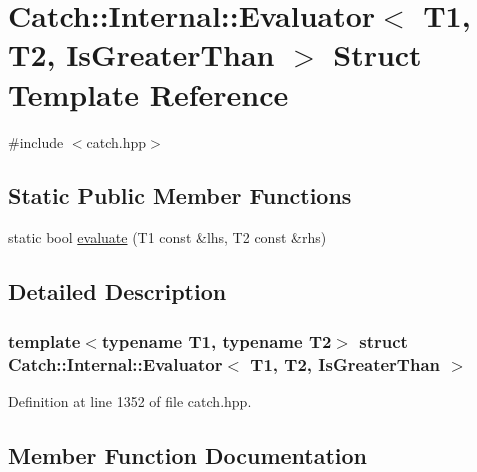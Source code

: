 \hypertarget{struct_catch_1_1_internal_1_1_evaluator_3_01_t1_00_01_t2_00_01_is_greater_than_01_4}{}\section{Catch\+:\+:Internal\+:\+:Evaluator$<$ T1, T2, Is\+Greater\+Than $>$ Struct Template Reference}
\label{struct_catch_1_1_internal_1_1_evaluator_3_01_t1_00_01_t2_00_01_is_greater_than_01_4}


{\ttfamily \#include $<$catch.\+hpp$>$}

\subsection*{Static Public Member Functions}
\begin{DoxyCompactItemize}
\item 
static bool \hyperlink{struct_catch_1_1_internal_1_1_evaluator_3_01_t1_00_01_t2_00_01_is_greater_than_01_4_a55745f74f09ac5c61bd3d592ca5560af}{evaluate} (T1 const \&lhs, T2 const \&rhs)
\end{DoxyCompactItemize}


\subsection{Detailed Description}
\subsubsection*{template$<$typename T1, typename T2$>$\newline
struct Catch\+::\+Internal\+::\+Evaluator$<$ T1, T2, Is\+Greater\+Than $>$}



Definition at line 1352 of file catch.\+hpp.



\subsection{Member Function Documentation}
\hypertarget{struct_catch_1_1_internal_1_1_evaluator_3_01_t1_00_01_t2_00_01_is_greater_than_01_4_a55745f74f09ac5c61bd3d592ca5560af}{}\label{struct_catch_1_1_internal_1_1_evaluator_3_01_t1_00_01_t2_00_01_is_greater_than_01_4_a55745f74f09ac5c61bd3d592ca5560af} 
